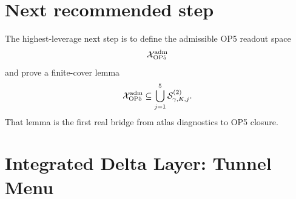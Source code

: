 \section{Next recommended step}

The highest-leverage next step is to define the admissible OP5 readout space
\[
\mathcal X_{\OP5}^{\mathrm{adm}}
\]
and prove a finite-cover lemma
\[
\mathcal X_{\OP5}^{\mathrm{adm}}
\subseteq
\bigcup_{j=1}^{5}\mathcal S_{\gamma,K,j}^{(2)}.
\]
That lemma is the first real bridge from atlas diagnostics to OP5 closure.



\clearpage
\section*{Integrated Delta Layer: Tunnel Menu}
\providecommand{\HC}{}
\renewcommand{\HC}{\mathrm{HC}}
\providecommand{\MM}{}
\renewcommand{\MM}{\mathrm{MM}}
\providecommand{\OP}{}
\renewcommand{\OP}{\mathrm{OP}}
\providecommand{\adm}{}
\renewcommand{\adm}{\mathrm{adm}}
\providecommand{\tun}{}
\renewcommand{\tun}{\mathrm{tun}}
\providecommand{\cand}{}
\renewcommand{\cand}{\mathrm{cand}}
\providecommand{\unr}{}
\renewcommand{\unr}{\mathrm{unr}}
\providecommand{\rout}{}
\renewcommand{\rout}{\mathrm{rout}}
\providecommand{\Halo}{}
\renewcommand{\Halo}{\mathsf{Halo}}
\providecommand{\Exit}{}
\renewcommand{\Exit}{\mathsf{Exit}}
\providecommand{\Trap}{}
\renewcommand{\Trap}{\mathsf{Trap}}
\providecommand{\Gate}{}
\renewcommand{\Gate}{\mathsf{Gate}}
\providecommand{\Atlas}{}
\renewcommand{\Atlas}{\mathfrak A}
\providecommand{\epsr}{}
\renewcommand{\epsr}{\varepsilon_r}
\providecommand{\epsh}{}
\renewcommand{\epsh}{\varepsilon_h}
\providecommand{\Xop}{}
\renewcommand{\Xop}{\mathcal X_{\OP5}^{\adm}}
\providecommand{\Ttun}{}
\renewcommand{\Ttun}{\mathcal T_{\tun}}
\providecommand{\Dhc}{}
\renewcommand{\Dhc}{D_{\HC\text{-}\mathrm{cone}}}
\providecommand{\ConeObs}{}
\renewcommand{\ConeObs}{D_{\OP5=\HC\text{-}\mathrm{cone}}}



\begin{abstract}
This delta layer inserts the nonstandard-halo step between the robust photon-frame contraction probe and the finite-atlas closure-candidate logic. Its purpose is to reduce the apparent combinatorial overload of OP5: instead of testing all admissible source-return routes as free trajectories, the OP5-facing branch is first trapped in a double-epsilon halo around the collapse kernel. Exit from this halo is then possible only through explicitly gated tunnel points. The result is conservative: OP5 is not closed here. The proof burden is reduced from an all-routes problem to a finite or finitely classifiable tunnel-point problem, provided the stated halo-capture, halo-invariance, and tunnel-gating hypotheses are later proved.
\end{abstract}

